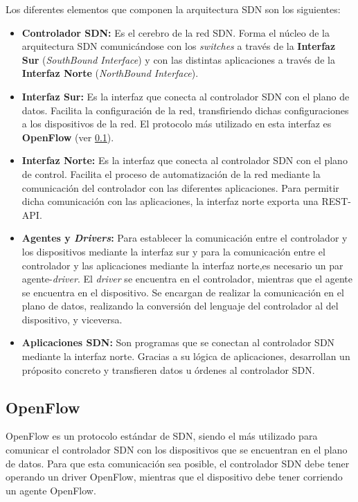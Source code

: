 Los diferentes elementos que componen la arquitectura SDN son los siguientes:

\begin{itemize}
	\item \textbf{Controlador SDN:} Es el cerebro de la red SDN. Forma el núcleo de la arquitectura SDN comunicándose con los \textit{switches} a través de la \textbf{Interfaz Sur} (\textit{SouthBound Interface}) y con las distintas aplicaciones a través de la \textbf{Interfaz Norte} (\textit{NorthBound Interface}).
	
	\item \textbf{Interfaz Sur:} Es la interfaz que conecta al controlador SDN con el plano de datos. Facilita la configuración de la red, transfiriendo dichas configuraciones a los dispositivos de la red. El protocolo más utilizado en esta interfaz es \textbf{OpenFlow} (ver \ref{subsec:openflow}).
	
	\item \textbf{Interfaz Norte:} Es la interfaz que conecta al controlador SDN con el plano de control. Facilita el proceso de automatización de la red mediante la comunicación del controlador con las diferentes aplicaciones. Para permitir dicha comunicación con las aplicaciones, la interfaz norte exporta una REST-API.
	
	\item \textbf{Agentes y \textit{Drivers}:} Para establecer la comunicación entre el controlador y los dispositivos mediante la interfaz sur y para la comunicación entre el controlador y las aplicaciones mediante la interfaz norte,es necesario un par agente-\textit{driver}. El \textit{driver} se encuentra en el controlador, mientras que el agente se encuentra en el dispositivo. Se encargan de realizar la comunicación en el plano de datos, realizando la conversión del lenguaje del controlador al del dispositivo, y viceversa.
	
	\item \textbf{Aplicaciones SDN:} Son programas que se conectan al controlador SDN mediante la interfaz norte. Gracias a su lógica de aplicaciones, desarrollan un próposito concreto y transfieren datos u órdenes al controlador SDN.
\end{itemize}


\subsection{OpenFlow}
\label{subsec:openflow}

OpenFlow\cite{openflowbib} es un protocolo estándar de SDN, siendo el más utilizado para comunicar el controlador SDN con los dispositivos que se encuentran en el plano de datos. Para que esta comunicación sea posible, el controlador SDN debe tener operando un driver OpenFlow, mientras que el dispositivo debe tener corriendo un agente OpenFlow. 

